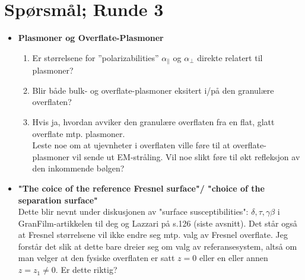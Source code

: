 \section{Spørsmål; Runde 3}
\begin{itemize}
   \item \textbf{Plasmoner og Overflate-Plasmoner}
      \begin{enumerate}
         \item Er størrelsene for ''polarizabilities'' $\alpha_{\parallel}$ og $\alpha_{\perp}$
            direkte relatert til plasmoner?
         \item Blir både bulk- og overflate-plasmoner eksitert i/på den granulære overflaten?
         \item Hvis ja, hvordan avviker den granulære overflaten fra en flat, glatt overflate
            mtp. plasmoner. \\
            Leste noe om at ujevnheter i overflaten ville føre til at overflate-plasmoner
            vil sende ut EM-stråling. Vil noe slikt føre til økt refleksjon av den inkommende bølgen?
      \end{enumerate}

   \item \textbf{"The coice of the reference Fresnel surface"/ "choice of the separation surface"}\\
      Dette blir nevnt under diskusjonen av "surface susceptibilities": $\delta, \tau, \gamma \beta$
      i GranFilm-artikkelen til deg og Lazzari på s.126 (siste avsnitt).
      Det står også at Fresnel størrelsene vil ikke endre seg mtp. valg av Fresnel overflate.
      Jeg forstår det slik at dette bare dreier seg om valg av referansesystem, altså 
      om man velger at den fysiske overflaten er satt $z=0$ eller en eller annen 
      $z=z_1 \neq 0$. Er dette riktig?
\end{itemize}

